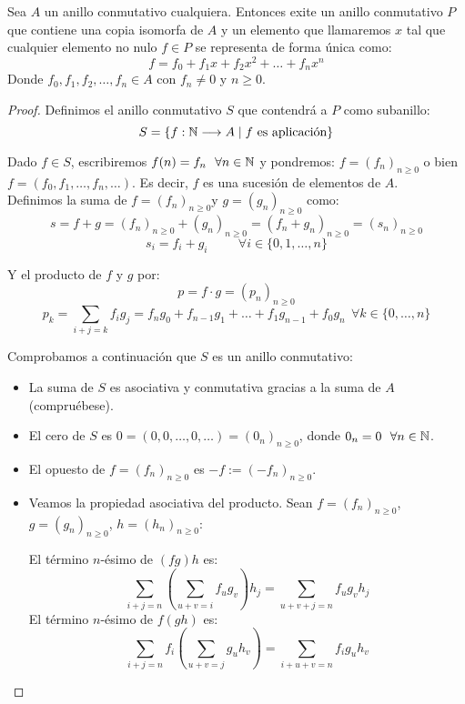 \begin{teo}
    Sea $A$ un anillo conmutativo cualquiera. Entonces exite un anillo conmutativo $P$ que contiene una copia isomorfa de $A$
    y un elemento que llamaremos $x$ tal que cualquier elemento no nulo $f \in P$ se representa de forma única como:
    $$f = f_0 + f_1x + f_2 x^2 + \ldots + f_n x^n$$
    Donde $f_0, f_1, f_2, \ldots, f_n \in A$ con $f_n \neq 0$ y $n \geq 0$.
\end{teo}
\begin{proof}
    Definimos el anillo conmutativo $S$ que contendrá a $P$ como subanillo:
    $$S = \{f:\mathbb N \longrightarrow A \mid f \mbox{ es aplicación}\}$$
    
    Dado $f\in S$, escribiremos $f(n) = f_n~~\forall n \in \mathbb N$ y pondremos: $f=(f_n)_{n\geq 0}$ o bien $f = (f_0, f_1, \ldots, f_n, \ldots)$. Es decir, $f$ es una sucesión de elementos de $A$.\\
    
    Definimos la suma de $f=(f_n)_{n\geq0} $y $g=(g_n)_{n\geq 0}$ como:
    $$s = f+g = (f_n)_{n\geq0} + (g_n)_{n\geq0} = (f_n+g_n)_{n\geq0} = (s_n)_{n\geq0}$$
    $$s_i = f_i + g_i \hspace{1cm} \forall i \in \{0, 1, \ldots, n\}$$
    
    Y el producto de $f$ y $g$ por:
    $$p = f\cdot g = (p_n)_{n\geq0}$$
    $$p_k = \sum_{i+j=k} f_i g_j = f_n g_0 + f_{n-1}g_1 + \ldots + f_1 g_{n-1} + f_0 g_n~~\forall k \in \{0, \ldots, n\}$$

    
    Comprobamos a continuación que $S$ es un anillo conmutativo:
    \begin{itemize}
        \item La suma de $S$ es asociativa y conmutativa gracias a la suma de $A$ (compruébese).

        \item El cero de $S$ es $0 = (0, 0, \ldots, 0, \ldots) = (0_n)_{n\geq0}$, donde $0_n = 0~~\forall n \in\mathbb N$.

        \item El opuesto de $f=(f_n)_{n\geq0}$ es $-f:=(-f_n)_{n\geq0}$.

        \item Veamos la propiedad asociativa del producto. Sean $f=(f_n)_{n\geq0}$, $g=(g_n)_{n\geq0}$, $h=(h_n)_{n\geq0}$:
        
        El término $n$-ésimo de $(fg)h$ es:
        $$\sum\limits_{i+j=n} \left( \sum_{u+v=i} f_u g_v \right) h_j = \sum_{u+v+j=n} f_u g_v h_j$$
        El término $n$-ésimo de $f(gh)$ es:
        $$\sum\limits_{i+j=n} f_i \left( \sum_{u+v=j} g_u h_v \right) = \sum_{i+u+v=n} f_i g_u h_v$$


\end{itemize}
\end{proof}

